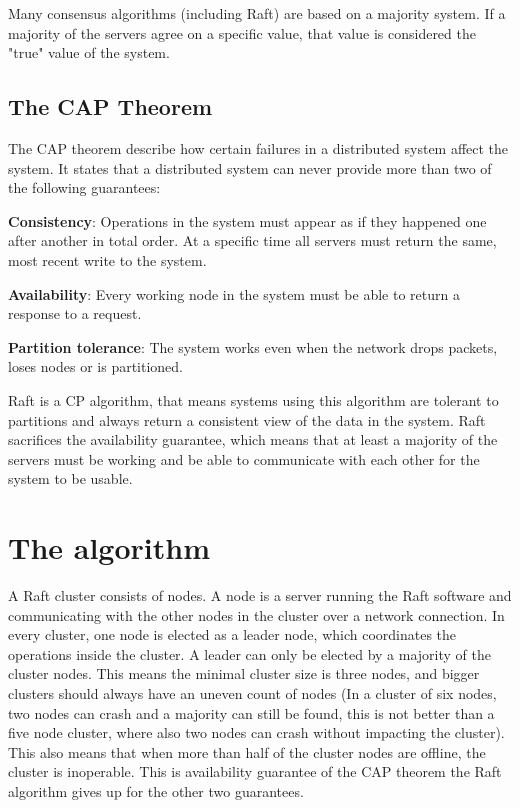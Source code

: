 Many consensus algorithms (including Raft) are based on a majority system. If a majority of the servers agree on a specific value, that value is considered the "true" value of the system.

\subsection{The CAP Theorem}
The CAP theorem describe how certain failures in a distributed system affect the system. It states that a distributed system can never provide more than two of the following guarantees: \cite{cap_theorem}

\textbf{Consistency}: Operations in the system must appear as if they happened one after another in total order. At a specific time all servers must return the same, most recent write to the system.

\textbf{Availability}: Every working node in the system must be able to return a response to a request.

\textbf{Partition tolerance}: The system works even when the network drops packets, loses nodes or is partitioned.

Raft is a CP algorithm, that means systems using this algorithm are tolerant to partitions and always return a consistent view of the data in the system. Raft sacrifices the availability guarantee, which means that at least a majority of the servers must be working and be able to communicate with each other for the system to be usable.

\section{The algorithm}
A Raft cluster consists of nodes. A node is a server running the Raft software and communicating with the other nodes in the cluster over a network connection.
In every cluster, one node is elected as a leader node, which coordinates the operations inside the cluster. A leader can only be elected by
a majority of the cluster nodes. This means the minimal cluster size is three nodes, and bigger clusters should always have an uneven count of nodes (In a cluster
of six nodes, two nodes can crash and a majority can still be found, this is not better than a five node cluster, where also two nodes can crash without impacting the cluster).
This also means that when more than half of the cluster nodes are offline, the cluster is inoperable.
This is availability guarantee of the CAP theorem the Raft algorithm gives up for the other two guarantees. 

